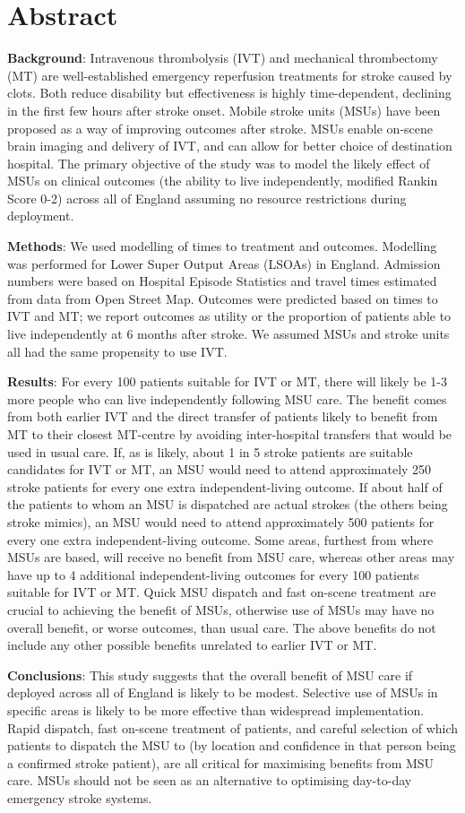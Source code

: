 \section*{Abstract}

\textbf{Background}: Intravenous thrombolysis (IVT) and mechanical thrombectomy (MT) are well-established emergency reperfusion treatments for stroke caused by clots. Both reduce disability but effectiveness is highly time-dependent, declining in the first few hours after stroke onset. Mobile stroke units (MSUs) have been proposed as a way of improving outcomes after stroke. MSUs enable on-scene brain imaging and delivery of IVT, and can allow for better choice of destination hospital. The primary objective of the study was to model the likely effect of MSUs on clinical outcomes (the ability to live independently, modified Rankin Score 0-2) across all of England assuming no resource restrictions during deployment. 

\textbf{Methods}: We used modelling of times to treatment and outcomes. Modelling was performed for Lower Super Output Areas (LSOAs) in England. Admission numbers were based on Hospital Episode Statistics and travel times estimated from data from Open Street Map. Outcomes were predicted based on times to IVT and MT; we report outcomes as utility or the proportion of patients able to live independently at 6 months after stroke. We assumed MSUs and stroke units all had the same propensity to use IVT.

\textbf{Results}: For every 100 patients suitable for IVT or MT, there will likely be 1-3 more people who can live independently following MSU care. The benefit comes from both earlier IVT and the direct transfer of patients likely to benefit from MT to their closest MT-centre by avoiding inter-hospital transfers that would be used in usual care. If, as is likely, about 1 in 5 stroke patients are suitable candidates for IVT or MT, an MSU would need to attend approximately 250 stroke patients for every one extra independent-living outcome. If about half of the patients to whom an MSU is dispatched are actual strokes (the others being stroke mimics), an MSU would need to attend approximately 500 patients for every one extra independent-living outcome. Some areas, furthest from where MSUs are based, will receive no benefit from MSU care, whereas other areas may have up to 4 additional independent-living outcomes for every 100 patients suitable for IVT or MT. Quick MSU dispatch and fast on-scene treatment are crucial to achieving the benefit of MSUs, otherwise use of MSUs may have no overall benefit, or worse outcomes, than usual care. The above benefits do not include any other possible benefits unrelated to earlier IVT or MT.

\textbf{Conclusions}: This study suggests that the overall benefit of MSU care if deployed across all of England is likely to be modest. Selective use of MSUs in specific areas is likely to be more effective than widespread implementation. Rapid dispatch, fast on-scene treatment of patients, and careful selection of which patients to dispatch the MSU to (by location and confidence in that person being a confirmed stroke patient), are all critical for maximising benefits from MSU care. MSUs should not be seen as an alternative to optimising day-to-day emergency stroke systems.